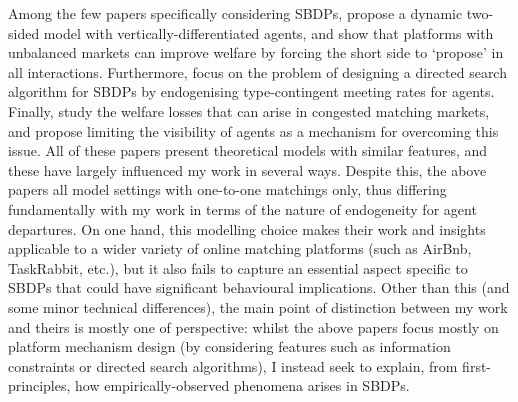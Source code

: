 Among the few papers specifically considering SBDPs, \cite{kanoria2021facilitating} propose a dynamic two-sided model with vertically-differentiated agents, and show that platforms with unbalanced markets can improve welfare by forcing the short side to `propose' in all interactions. 
Furthermore, \cite{immorlica2021designing} focus on the problem of designing a directed search algorithm for SBDPs by endogenising type-contingent meeting rates for agents. 
Finally, \cite{arnosti2021managing} study the welfare losses that can arise in congested matching markets, and propose limiting the visibility of agents as a mechanism for overcoming this issue.
All of these papers present theoretical models with similar features, and these have largely influenced my work in several ways. 
Despite this, the above papers all model settings with one-to-one matchings only, thus differing fundamentally with my work in terms of the nature of endogeneity for agent departures. 
On one hand, this modelling choice makes their work and insights applicable to a wider variety of online matching platforms (such as AirBnb, TaskRabbit, etc.), but it also fails to capture an essential aspect specific to SBDPs that could have significant behavioural implications. 
Other than this (and some minor technical differences), the main point of distinction between my work and theirs is mostly one of perspective: whilst the above papers focus mostly on  platform mechanism design (by considering features such as information constraints or directed search algorithms), I instead seek to explain, from first-principles, how empirically-observed phenomena arises in SBDPs.